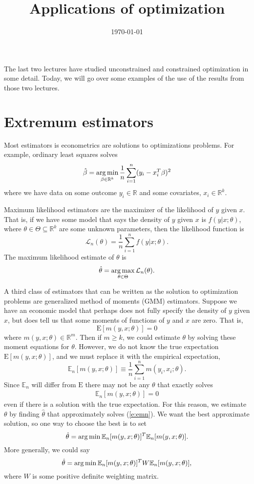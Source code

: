 \documentclass[12pt,reqno]{amsart}
\title{Applications of optimization}
\date{\today}
\theoremstyle{definition}
\newcommand{\argmax}{\operatornamewithlimits{arg\,max}}
\newcommand{\argmin}{\operatornamewithlimits{arg\,min}}
\def\R{\mathbb{R}}
\providecommand{\En}{\mathbb{E}_n}
\providecommand{\Er}{{\mathrm{E}}}
\begin{document}
\maketitle

The last two lectures have studied unconstrained and constrained
optimization in some detail. Today, we will go over some examples of
the use of the results from those two lectures.

\section{Extremum estimators}

Most estimators is econometrics are solutions to optimizations
problems. For example, ordinary least squares solves
\[ \hat{\beta} = \argmin_{\beta \in \R^k} \frac{1}{n} \sum_{i=1}^n
(y_i - x_i^T \beta)^2  \] 
where we have data on some outcome $y_i \in \R$ and some covariates,
$x_i \in \R^k$. 

Maximum likelihood estimators are the maximizer of the
likelihood of $y$ given $x$. That is, if we have some model that says
the density of $y$ given $x$ is $f(y|x;\theta)$, where $\theta \in
\Theta \subseteq \R^k$ are
some unknown parameters, then the likelihood function is
\[ \mathcal{L}_n(\theta) = \frac{1}{n} \sum_{i=1}^n f(y|x;\theta). \]
The maximum likelihood estimate of $\theta$ is
\[ \hat{\theta} = \argmax_{\theta \in \Theta}
\mathcal{L}_n(\theta). \] 

A third class of estimators that can be written as the solution to
optimization problems are generalized method of moments (GMM)
estimators. Suppose we have an economic model that perhaps does not
fully specify the density of $y$ given $x$, but does tell us that some
moments of functions of $y$ and $x$ are zero. That is,
\[ \Er[m(y,x;\theta)] = 0 \]
where $m(y,x;\theta) \in \R^m$. Then if $m \geq k$, we could estimate
$\theta$ by solving these moment equations for $\theta$. However, we
do not know the true expectation $\Er[m(y,x;\theta)]$, and we must
replace it with the empirical expectation,
\[ \En[m(y,x;\theta)] \equiv \frac{1}{n} \sum_{i=1}^n
m(y_i,x_i;\theta). \]
Since $\En$ will differ from $\Er$ there may not be any $\theta$ that
exactly solves 
\begin{align} \En[m(y,x;\theta)]=0 \label{e:emn} \end{align}
even if there is a solution with the true expectation. For this
reason, we estimate $\theta$ by finding $\hat{\theta}$ that
approximately solves (\ref{e:emn}). We want the best approximate
solution, so one way to choose the best is to set
\[ \hat{\theta} = \argmin \En[m(y,x;\theta)]^T \En[m(y,x;\theta)]. \]
More generally, we could say
\[ \hat{\theta} = \argmin \En[m(y,x;\theta)]^T W
\En[m(y,x;\theta)], \]
where $W$ is some positive definite weighting matrix. 
\end{document}

